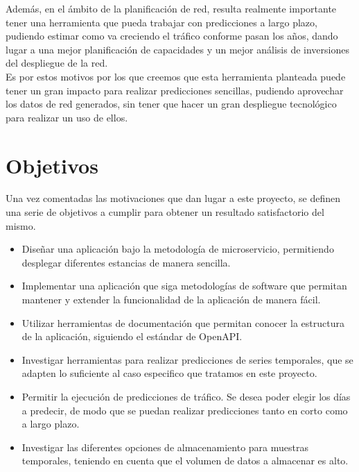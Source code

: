 \documentclass[a4paper, oneside, 12pt]{book}
\begin{document}
	\pagebreak
	
	\noindent Además, en el ámbito de la planificación de red, resulta realmente importante tener una herramienta que pueda trabajar con predicciones a largo plazo, pudiendo estimar como va creciendo el tráfico conforme pasan los años, dando lugar a una mejor planificación de capacidades y un mejor análisis de inversiones del despliegue de la red. \\
	
	\noindent Es por estos motivos por los que creemos que esta herramienta planteada puede tener un gran impacto para realizar predicciones sencillas, pudiendo aprovechar los datos de red generados, sin tener que hacer un gran despliegue tecnológico para realizar un uso de ellos. \\
	
	
	\section{Objetivos}
	
	\noindent Una vez comentadas las motivaciones que dan lugar a este proyecto, se definen una serie de objetivos a cumplir para obtener un resultado satisfactorio del mismo.
	
	\begin{itemize}
		\item Diseñar una aplicación bajo la metodología de microservicio, permitiendo desplegar diferentes estancias de manera sencilla.
		
		\item Implementar una aplicación que siga metodologías de software que permitan mantener y extender la funcionalidad de la aplicación de manera fácil.
		
		\item Utilizar herramientas de documentación que permitan conocer la estructura de la aplicación, siguiendo el estándar de OpenAPI.
		
		\item Investigar herramientas para realizar predicciones de series temporales, que se adapten lo suficiente al caso especifico que tratamos en este proyecto.
		
		\item Permitir la ejecución de predicciones de tráfico. Se desea poder elegir los días a predecir, de modo que se puedan realizar predicciones tanto en corto como a largo plazo.
		
		\item Investigar las diferentes opciones de almacenamiento para muestras temporales, teniendo en cuenta que el volumen de datos a almacenar es alto. 
	\end{itemize}
	
\end{document}

